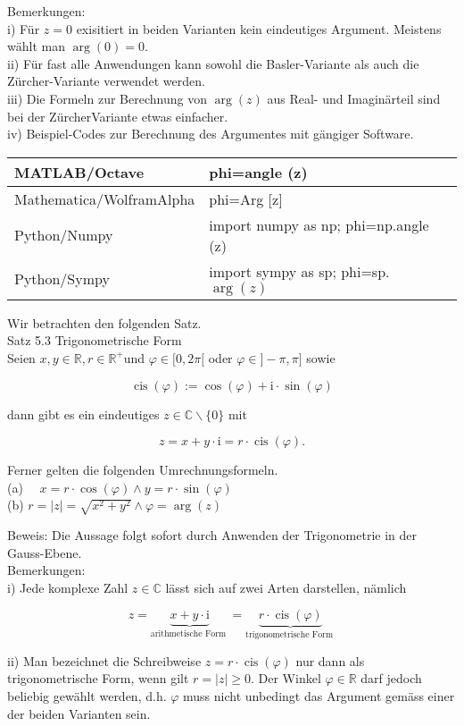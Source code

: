 \documentclass[10pt]{article}
\begin{document}
Bemerkungen:\\
i) Für $z=0$ exisitiert in beiden Varianten kein eindeutiges Argument. Meistens wählt man $\arg (0)=0$.\\
ii) Für fast alle Anwendungen kann sowohl die Basler-Variante als auch die Zürcher-Variante verwendet werden.\\
iii) Die Formeln zur Berechnung von $\arg (z)$ aus Real- und Imaginärteil sind bei der ZürcherVariante etwas einfacher.\\
iv) Beispiel-Codes zur Berechnung des Argumentes mit gängiger Software.

\begin{center}
\begin{tabular}{|l|l|}
\hline
MATLAB/Octave & phi=angle (z) \\
\hline
Mathematica/WolframAlpha & phi=Arg [z] \\
\hline
Python/Numpy & import numpy as np; phi=np.angle (z) \\
\hline
Python/Sympy & import sympy as sp; phi=sp. $\arg (z)$ \\
\hline
\end{tabular}
\end{center}

Wir betrachten den folgenden Satz.\\
Satz 5.3 Trigonometrische Form\\
Seien $x, y \in \mathbb{R}, r \in \mathbb{R}^{+}$und $\varphi \in[0,2 \pi[$ oder $\varphi \in]-\pi, \pi]$ sowie


\begin{equation*}
\operatorname{cis}(\varphi):=\cos (\varphi)+\mathrm{i} \cdot \sin (\varphi) \tag{5.17}
\end{equation*}


dann gibt es ein eindeutiges $z \in \mathbb{C} \backslash\{0\}$ mit


\begin{equation*}
z=x+y \cdot \mathrm{i}=r \cdot \operatorname{cis}(\varphi) . \tag{5.18}
\end{equation*}


Ferner gelten die folgenden Umrechnungsformeln.\\
(a) $\quad x=r \cdot \cos (\varphi) \wedge y=r \cdot \sin (\varphi)$\\
(b) $r=|z|=\sqrt{x^{2}+y^{2}} \wedge \varphi=\arg (z)$

Beweis: Die Aussage folgt sofort durch Anwenden der Trigonometrie in der Gauss-Ebene.\\
Bemerkungen:\\
i) Jede komplexe Zahl $z \in \mathbb{C}$ lässt sich auf zwei Arten darstellen, nämlich


\begin{equation*}
z=\underbrace{x+y \cdot \mathrm{i}}_{\text {arithmetische Form }}=\underbrace{r \cdot \operatorname{cis}(\varphi)}_{\text {trigonometrische Form }} \tag{5.19}
\end{equation*}


ii) Man bezeichnet die Schreibweise $z=r \cdot \operatorname{cis}(\varphi)$ nur dann als trigonometrische Form, wenn gilt $r=|z| \geq 0$. Der Winkel $\varphi \in \mathbb{R}$ darf jedoch beliebig gewählt werden, d.h. $\varphi$ muss nicht unbedingt das Argument gemäss einer der beiden Varianten sein.
\end{document}
